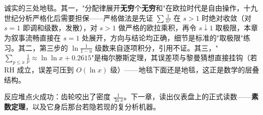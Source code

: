 \begin{chengshi}
诚实的三处地毯。其一，"分配律展开\textbf{无穷}个\textbf{无穷}和"在欧拉时代是自由操作，十九世纪分析严格化后需要担保——严格做法是先证 $\sum \tfrac1{n^s}$ 在 $s>1$ 时绝对收敛（对 $s=1$ 即调和级数，发散），对 $s>1$ 做严格的欧拉乘积，再令 $s \downarrow 1$ 取极限，本章为叙事流畅直接在 $s = 1$ 处展开，方向与结论均正确，细节是标准的"取极限"练习。其二，第三步的 $\ln\tfrac1{1-u}$ 级数来自逐项积分，引用不证。其三，"$\sum_{p\le x}\tfrac1p \approx \ln\ln x + 0.2615$"是梅尔滕斯定理，其误差项与黎曼猜想直接挂钩（若 RH 成立，误差可压到 $O(\ln x)$ 级）——地毯下面还是地毯，这正是数学的层叠结构。
\end{chengshi}

反应堆点火成功：齿轮咬出了密度 $\tfrac1{\ln x}$。下一章，读出仪表盘上的正式读数——\textbf{素数定理}，以及它身后那台若隐若现的复分析机器。
